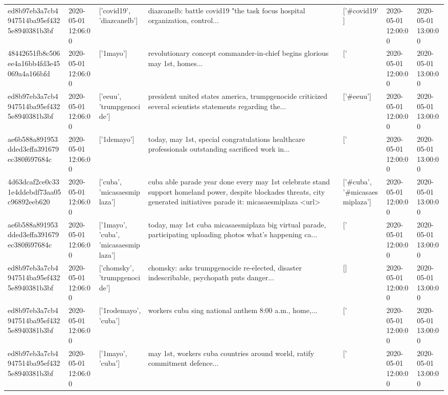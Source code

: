 \begin{tabular}{lllllll}
ed8b97eb3a7cb4947514ba95ef4325e8940381b3bf & 2020-05-01 12:06:00 & ['covid19', 'diazcanelb'] & diazcanelb: battle covid19 "the task focus hospital organization, control... & ['#covid19'] & 2020-05-01 12:00:00 & 2020-05-01 13:00:00 \\
48442651fb8c506ee4a16bb4fd3e45069a4a166bfd & 2020-05-01 12:06:00 & ['1mayo'] & revolutionary concept commander-in-chief begins glorious may 1st, homes... & ['#1mayo'] & 2020-05-01 12:00:00 & 2020-05-01 13:00:00 \\
ed8b97eb3a7cb4947514ba95ef4325e8940381b3bf & 2020-05-01 12:06:00 & ['eeuu', 'trumpgenocide'] & president united states america, trumpgenocide criticized several scientists statements regarding the... & ['#eeuu'] & 2020-05-01 12:00:00 & 2020-05-01 13:00:00 \\
ae6b588a891953dded3effa391679ec380f697684c & 2020-05-01 12:06:00 & ['1demayo'] & today, may 1st, special congratulations healthcare professionals outstanding sacrificed work in... & ['#1demayo'] & 2020-05-01 12:00:00 & 2020-05-01 13:00:00 \\
4d63dcaf2ce0c331e4ddebdf73aa05c96892eeb620 & 2020-05-01 12:06:00 & ['cuba', 'micasaesmiplaza'] & cuba able parade year done every may 1st celebrate stand support homeland power, despite blockades threats, city generated initiatives parade it: micasaesmiplaza <url> & ['#cuba', '#micasaesmiplaza'] & 2020-05-01 12:00:00 & 2020-05-01 13:00:00 \\
ae6b588a891953dded3effa391679ec380f697684c & 2020-05-01 12:06:00 & ['1mayo', 'cuba', 'micasaesmiplaza'] & today, may 1st cuba micasaesmiplaza big virtual parade, participating uploading photos what's happening ca... & ['#1mayo', '#cuba', '#micasaesmiplaza'] & 2020-05-01 12:00:00 & 2020-05-01 13:00:00 \\
ed8b97eb3a7cb4947514ba95ef4325e8940381b3bf & 2020-05-01 12:06:00 & ['chomsky', 'trumpgenocide'] & chomsky: asks trumpgenocide re-elected, disaster indescribable, psychopath puts danger... & [] & 2020-05-01 12:00:00 & 2020-05-01 13:00:00 \\
ed8b97eb3a7cb4947514ba95ef4325e8940381b3bf & 2020-05-01 12:06:00 & ['1rodemayo', 'cuba'] & workers cuba sing national anthem 8:00 a.m., home,... & ['#1rodemayo', '#cuba'] & 2020-05-01 12:00:00 & 2020-05-01 13:00:00 \\
ed8b97eb3a7cb4947514ba95ef4325e8940381b3bf & 2020-05-01 12:06:00 & ['1mayo', 'cuba'] & may 1st, workers cuba countries around world, ratify commitment defence... & ['#1mayo', '#cuba'] & 2020-05-01 12:00:00 & 2020-05-01 13:00:00 \\

\end{tabular}
